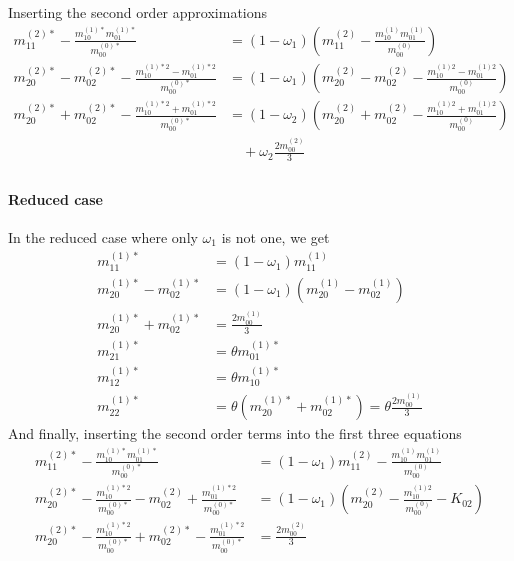 Inserting the second order approximations
\begin{equation}
  \begin{aligned}
    m_{11}^{(2)*} - \frac{ m_{10}^{(1)*}m_{01}^{(1)*}}{m_{00}^{(0)*}} & = (1-\omega_1)\left(m_{11}^{(2)} - \frac{ m_{10}^{(1)}m_{01}^{(1)}}{m_{00}^{(0)}}\right) \\
    m_{20}^{(2)*}-m_{02}^{(2)*} - \frac{ m_{10}^{(1)*2} - m_{01}^{(1)*2}}{m_{00}^{(0)*}} & = (1-\omega_1) \left(m_{20}^{(2)}-m_{02}^{(2)} - \frac{ m_{10}^{(1)2} - m_{01}^{(1)2}}{m_{00}^{(0)}}\right) \\
    m_{20}^{(2)*}+m_{02}^{(2)*} - \frac{ m_{10}^{(1)*2} + m_{01}^{(1)*2}}{m_{00}^{(0)*}} & = (1-\omega_2)
    \left(m_{20}^{(2)}+m_{02}^{(2)} - \frac{ m_{10}^{(1)2} + m_{01}^{(1)2}}{m_{00}^{(0)}}\right)
    \\&\quad
    + \omega_2 \frac{2 m_{00}^{(2)}}{3} \\
  \end{aligned}
\end{equation}

\paragraph{Reduced case}
\label{par:Reduced case}
In the reduced case where only $\omega_1$ is not one, we get
\begin{equation}
  \begin{aligned}
    m_{11}^{(1)*} & = (1-\omega_1) m_{11}^{(1)} \\
    m_{20}^{(1)*} - m_{02}^{(1)*}
      & = (1-\omega_1) (m_{20}^{(1)} - m_{02}^{(1)}) \\
    m_{20}^{(1)*} + m_{02}^{(1)*}
      & =  \frac{2 m_{00}^{(1)}}{3} \\
    m_{21}^{(1)*} & = \theta m_{01}^{(1)*} \\
    m_{12}^{(1)*} & = \theta m_{10}^{(1)*} \\
    m_{22}^{(1)*} & = \theta (m_{20}^{(1)*} + m_{02}^{(1)*}) = \theta \frac{2 m_{00}^{(1)}}{3}
  \end{aligned}
\end{equation}
And finally, inserting the second order terms into the first three equations
\begin{equation}
  \begin{aligned}
    m_{11}^{(2)*} - \frac{ m_{10}^{(1)*}m_{01}^{(1)*}}{m_{00}^{(0)*}} & = (1-\omega_1)m_{11}^{(2)} - \frac{ m_{10}^{(1)}m_{01}^{(1)}}{m_{00}^{(0)}} \\
    m_{20}^{(2)*} - \frac{ m_{10}^{(1)*2}}{m_{00}^{(0)*}} - m_{02}^{(2)} + \frac{ m_{01}^{(1)*2}}{m_{00}^{(0)*}}
      & = (1-\omega_1) (m_{20}^{(2)} - \frac{ m_{10}^{(1)2}}{m_{00}^{(0)}} - K_{02}) \\
    m_{20}^{(2)*} - \frac{ m_{10}^{(1)*2}}{m_{00}^{(0)*}} + m_{02}^{(2)*} - \frac{ m_{01}^{(1)*2}}{m_{00}^{(0)*}}
      & =  \frac{2 m_{00}^{(2)}}{3} \\
  \end{aligned}
\end{equation}
